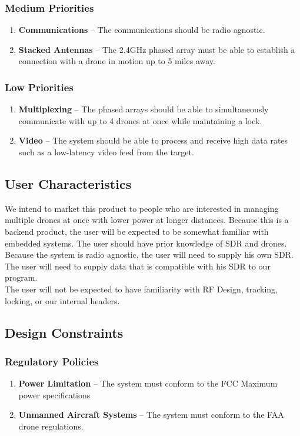 \documentclass[ProjectRequirements.tex]{subfiles}
\begin{document}
		\subsubsection{Medium Priorities}
			\begin{enumerate}
				\item \textbf{Communications} -- The communications should be radio agnostic.
				\item \textbf{Stacked Antennas} -- The 2.4GHz phased array must be able to establish a connection with a drone in motion up to 5 miles away.
			\end{enumerate}
		
		\subsubsection{Low Priorities}
			\begin{enumerate}
				\item \textbf{Multiplexing} -- The phased arrays should be able to simultaneously communicate with up to 4 drones at once while maintaining a lock.
				\item \textbf{Video} -- The system should be able to process and receive high data rates such as a low-latency video feed from the target.
			\end{enumerate}
		
	\subsection{User Characteristics}
		We intend to market this product to people who are interested in managing multiple drones at once with lower power at longer distances. Because this is a backend product, the user will be expected to be somewhat familiar with embedded systems. The user should have prior knowledge of SDR and drones. Because the system is radio agnostic, the user will need to supply his own SDR. The user will need to supply data that is compatible with his SDR to our program.\\
		
		The user will not be expected to have familiarity with RF Design, tracking, locking, or our internal headers.
		
	\subsection{Design Constraints}
		\subsubsection{Regulatory Policies}
			\begin{enumerate}
				\item \textbf{Power Limitation} -- The system must conform to the FCC Maximum power specifications
				\item \textbf{Unmanned Aircraft Systems} -- The system must conform to the FAA drone regulations.
			\end{enumerate}
\end{document}
